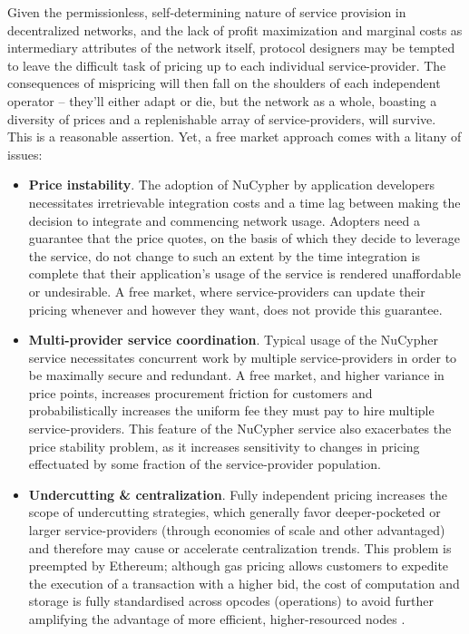 \documentclass[longbibliography,nofootinbib]{revtex4-1}
\begin{document}
Given the permissionless, self-determining nature of service provision in decentralized networks, and the lack of profit maximization and marginal costs as intermediary attributes of the network itself, protocol designers may be tempted to leave the difficult task of pricing up to each individual service-provider. The consequences of mispricing will then fall on the shoulders of each independent operator – they’ll either adapt or die, but the network as a whole, boasting a diversity of prices and a replenishable array of service-providers, will survive. This is a reasonable assertion. Yet, a free market approach comes with a litany of issues: 
\begin{itemize}
    \item \textbf{Price instability}. The adoption of NuCypher by application developers necessitates irretrievable integration costs and a time lag between making the decision to integrate and commencing network usage. Adopters need a guarantee that the price quotes, on the basis of which they decide to leverage the service, do not change to such an extent by the time integration is complete that their application’s usage of the service is rendered unaffordable or undesirable. A free market, where service-providers can update their pricing whenever and however they want, does not provide this guarantee. 
    \item \textbf{Multi-provider service coordination}. Typical usage of the NuCypher service necessitates concurrent work by multiple service-providers in order to be maximally secure and redundant. A free market, and higher variance in price points, increases procurement friction for customers and probabilistically increases the uniform fee they must pay to hire multiple service-providers. This feature of the NuCypher service also exacerbates the price stability problem, as it increases sensitivity to changes in pricing effectuated by some fraction of the service-provider population.
    \item \textbf{Undercutting \& centralization}.  Fully independent pricing increases the scope of undercutting strategies, which generally favor deeper-pocketed or larger service-providers (through economies of scale and other advantaged) and therefore may cause or accelerate centralization trends. This problem is preempted by Ethereum; although gas pricing allows customers to expedite the execution of a transaction with a higher bid, the cost of computation and storage is fully standardised across opcodes (operations) to avoid further amplifying the advantage of more efficient, higher-resourced nodes \cite{ethgas}. 

\end{itemize}
\end{document}

